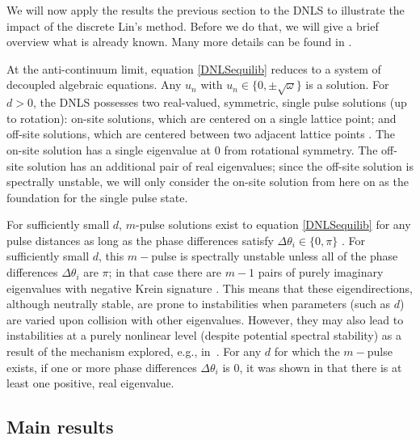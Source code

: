 \documentclass[12pt]{elsarticle}
\begin{document}
We will now apply the results the previous section to the DNLS to illustrate the impact of the discrete Lin's method. Before we do that, we will give a brief overview what is already known. Many more details can be found in \cite{Kevrekidis2009,pelinovsky_2011}. 

At the anti-continuum limit, equation \cref{DNLSequilib} reduces to a system of decoupled algebraic equations. Any $u_n$ with $u_n \in \{ 0, \pm \sqrt{\omega}\}$ is a solution. For $d > 0$, the DNLS possesses two real-valued, symmetric, single pulse solutions (up to rotation): on-site solutions, which are centered on a single lattice point; and off-site solutions, which are centered between two adjacent lattice points \cite{Kevrekidis2009}. The on-site solution has a single eigenvalue at 0 from rotational symmetry. The off-site solution has an additional pair of real eigenvalues; since the off-site solution is spectrally unstable, we will only consider the on-site solution from here on as the foundation for the single pulse state. 

For sufficiently small $d$, $m$-pulse solutions exist to equation \cref{DNLSequilib} for any pulse distances as long as the phase differences satisfy $\Delta \theta_i \in \{0, \pi\}$ \cite[Proposition 2.1]{Pelinovsky2005}. For sufficiently small $d$, this $m-$pulse is spectrally unstable unless all of the phase differences $\Delta \theta_i$ are $\pi$; in that case there are $m-1$ pairs of purely imaginary eigenvalues with negative Krein signature \cite[Theorem 3.6]{Pelinovsky2005}. This means that these eigendirections, although neutrally stable, are prone to instabilities when parameters (such as $d$) are varied upon collision with other eigenvalues. However, they may also lead to instabilities at a purely nonlinear level (despite potential spectral stability) as a result of the mechanism explored, e.g., in~\cite{CUCCAGNA200938,PRL_2015}. For any $d$ for which the $m-$pulse exists, if one or more phase differences $\Delta \theta_i$ is 0, it was shown in \cite{Kapitula2001a} that there is at least one positive, real eigenvalue.

\subsection{Main results}
\end{document}
